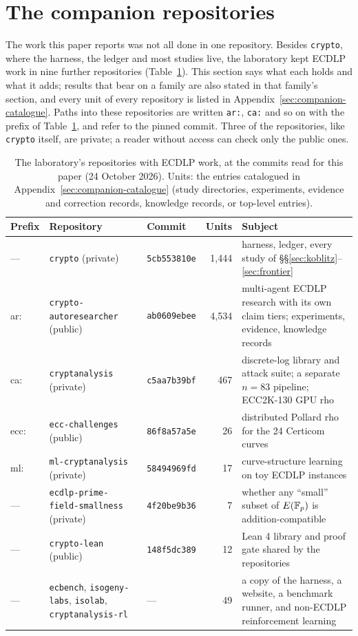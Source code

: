 \section{The companion repositories}\label{sec:companion}

The work this paper reports was not all done in one repository. Besides
\texttt{crypto}, where the harness, the ledger and most studies live, the
laboratory kept ECDLP work in nine further repositories
(Table~\ref{tab:repos}). This section says what each holds and what it adds;
results that bear on a family are also stated in that family's section, and
every unit of every repository is listed in
Appendix~\ref{sec:companion-catalogue}. Paths into these repositories are
written \texttt{ar:}, \texttt{ca:} and so on with the prefix of
Table~\ref{tab:repos}, and refer to the pinned commit. Three of the
repositories, like \texttt{crypto} itself, are private; a reader without
access can check only the public ones.

\begin{table}[t]
\centering\small
\caption[]{The laboratory's repositories with ECDLP work, at the commits
read for this paper (24 October 2026). Units: the entries catalogued in
Appendix~\ref{sec:companion-catalogue} (study directories, experiments,
evidence and correction records, knowledge records, or top-level entries).}
\label{tab:repos}
\begin{tabularx}{\linewidth}{@{}l l l r >{\raggedright\arraybackslash}X@{}}
\toprule
Prefix & Repository & Commit & Units & Subject \\
\midrule
--- & \texttt{crypto} (private) & \texttt{5cb553810e} & 1{,}444 & harness, ledger, every study of \S\S\ref{sec:koblitz}--\ref{sec:frontier} \\
ar: & \texttt{crypto-autoresearcher} (public) & \texttt{ab0609ebee} & 4{,}534 & multi-agent ECDLP research with its own claim tiers; experiments, evidence, knowledge records \\
ca: & \texttt{cryptanalysis} (private) & \texttt{c5aa7b39bf} & 467 & discrete-log library and attack suite; a separate $n=83$ pipeline; ECC2K-130 GPU rho \\
ecc: & \texttt{ecc-challenges} (public) & \texttt{86f8a57a5e} & 26 & distributed Pollard rho for the 24 Certicom curves \\
ml: & \texttt{ml-cryptanalysis} (private) & \texttt{58494969fd} & 17 & curve-structure learning on toy ECDLP instances \\
--- & \texttt{ecdlp-prime-field-smallness} (private) & \texttt{4f20be9b36} & 7 & whether any ``small'' subset of $E(\mathbb{F}_p)$ is addition-compatible \\
--- & \texttt{crypto-lean} (public) & \texttt{148f5dc389} & 12 & Lean 4 library and proof gate shared by the repositories \\
--- & \texttt{ecbench}, \texttt{isogeny-labs}, \texttt{isolab}, \texttt{cryptanalysis-rl} & --- & 49 & a copy of the harness, a website, a benchmark runner, and non-ECDLP reinforcement learning \\
\bottomrule
\end{tabularx}
\end{table}

